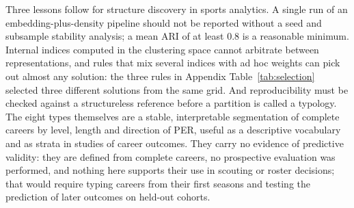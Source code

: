 Three lessons follow for structure discovery in sports analytics. A single run of an embedding-plus-density pipeline should not be reported without a seed and subsample stability analysis; a mean ARI of at least 0.8 is a reasonable minimum. Internal indices computed in the clustering space cannot arbitrate between representations, and rules that mix several indices with ad hoc weights can pick out almost any solution: the three rules in Appendix Table~\ref{tab:selection} selected three different solutions from the same grid. And reproducibility must be checked against a structureless reference before a partition is called a typology. The eight types themselves are a stable, interpretable segmentation of complete careers by level, length and direction of PER, useful as a descriptive vocabulary and as strata in studies of career outcomes. They carry no evidence of predictive validity: they are defined from complete careers, no prospective evaluation was performed, and nothing here supports their use in scouting or roster decisions; that would require typing careers from their first seasons and testing the prediction of later outcomes on held-out cohorts.
